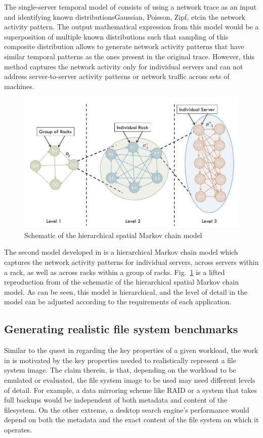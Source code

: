The single-server temporal model of \cite{echo} consists of using
a network trace as an input and identifying known distributions\textemdash{}Gaussian,
Poisson, Zipf, etc\textemdash{}in the network activity pattern. The output 
mathematical expression from this model would be a superposition of
multiple known distributions such that sampling of this composite
distribution allows to generate network activity patterns that have
similar temporal patterns as the ones present in the original trace.
However, this method captures the network activity only for
individual servers and can not address server-to-server activity
patterns or network traffic across sets of machines.

\begin{figure}[t]
	\centering
	\includegraphics[scale=0.4]{presyn-figures/echo.jpg}
	\caption{Schematic of the hierarchical spatial Markov chain model~\cite{echo}}
	\label{fig:echo}
\end{figure}

The second model developed in \cite{echo} is a hierarchical Markov
chain model which captures the network activity patterns for
individual servers, across servers within a rack, as well as
across racks within a group of racks. Fig.~\ref{fig:echo} is 
a lifted reproduction from \cite{echo} of the schematic of
the hierarchical spatial Markov chain model. 
As can be seen, this model is hierarchical, and 
the level of detail in the model can be adjusted according to the
requirements of each application.

\subsection{Generating realistic file system benchmarks}
Similar to the quest in \cite{distiller} regarding the key properties 
of a given workload, the work in \cite{impressions} is motivated by
the key properties needed to realistically represent a file system
image. The claim therein, is that, depending on the workload to
be emulated or evaluated, the file system image to be used may
need different levels of detail. For example, a data mirroring
scheme like RAID or a system that takes full backups would be
independent of both metadata and content of the filesystem.
On the other extreme, a desktop search engine's performance
would depend on both the metadata and the exact content of
the file system on which it operates.

